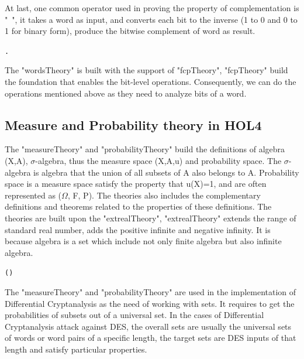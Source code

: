 \documentclass{article}
\begin{document}
At last, one common operator used in proving the property of complementation is "~", it takes a word as input, and converts
each bit to the inverse (1 to 0 and 0 to 1 for binary form), produce the bitwise complement of word as result.

\begin{alltt}
   \HOLTokenTurnstile{} \HOLSymConst{\HOLTokenNeg{}} \HOLSymConst{=}  . \HOLSymConst{\HOLTokenNeg{}}  
\end{alltt}

The "wordsTheory" is built with the support of "fcpTheory", "fcpTheory" build the foundation that enables the bit-level operations.
Consequently, we can do the operations mentioned above as they need to analyze bits of a word.

\subsection{Measure and Probability theory in HOL4}

The "measureTheory" and "probabilityTheory" build the definitions of algebra (X,A), \( \sigma \)-algebra, thus the measure space (X,A,u) and probability
space. The \( \sigma \)-algebra is algebra that the union of all subsets of A also belongs to A. Probability space is a measure space satisfy the
property that u(X)=1, and are often represented as (\( \Omega \), F, P). The theories also includes the complementary definitions and
theorems related to the properties of these definitions. The theories are built upon the "extrealTheory", "extrealTheory"
extends the range of standard real number, adds the positive infinite and negative infinity. It is because algebra is a set which
include not only finite algebra but also infinite algebra.

\begin{alltt}
   \HOLTokenTurnstile{}   \HOLSymConst{\HOLTokenEquiv{}}
    ( ) \HOLSymConst{\HOLTokenConj{}}   \HOLSymConst{\HOLTokenConj{}}
    
\end{alltt}

The "measureTheory" and "probabilityTheory" are used in the implementation of Differential Cryptanalysis as the need of working with
sets. It requires to get the probabilities of subsets out of a universal set. In the cases of Differential Cryptanalysis attack against
DES, the overall sets are usually the universal sets of words or word pairs of a specific length, the target sets are DES
inputs of that length and satisfy particular properties.
\end{document}
